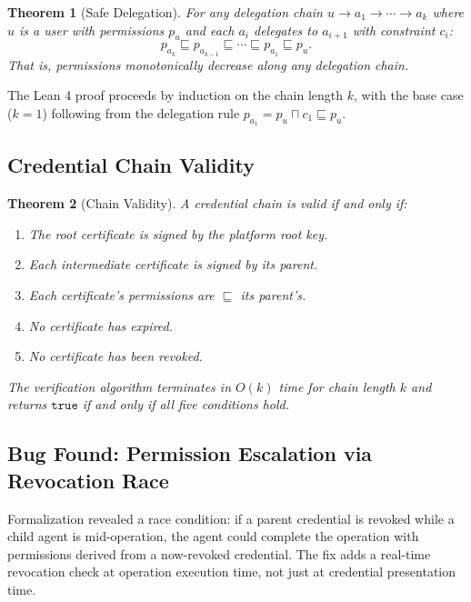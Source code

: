 \documentclass[11pt]{article}
\newtheorem{theorem}{Theorem}
\begin{document}
\begin{theorem}[Safe Delegation]
\label{thm:safe-delegation}
For any delegation chain $u \to a_1 \to \cdots \to a_k$ where $u$ is a user
with permissions $p_u$ and each $a_i$ delegates to $a_{i+1}$ with constraint
$c_i$:
\begin{equation}
p_{a_k} \sqsubseteq p_{a_{k-1}} \sqsubseteq \cdots \sqsubseteq p_{a_1}
\sqsubseteq p_u.
\end{equation}
That is, permissions monotonically decrease along any delegation chain.
\end{theorem}

The Lean 4 proof proceeds by induction on the chain length $k$, with the base
case ($k=1$) following from the delegation rule $p_{a_1} = p_u \sqcap c_1
\sqsubseteq p_u$.

\subsection{Credential Chain Validity}

\begin{theorem}[Chain Validity]
A credential chain is valid if and only if:
\begin{enumerate}[leftmargin=1.4em]
    \item The root certificate is signed by the platform root key.
    \item Each intermediate certificate is signed by its parent.
    \item Each certificate's permissions are $\sqsubseteq$ its parent's.
    \item No certificate has expired.
    \item No certificate has been revoked.
\end{enumerate}
The verification algorithm terminates in $O(k)$ time for chain length $k$ and
returns $\texttt{true}$ if and only if all five conditions hold.
\end{theorem}

\subsection{Bug Found: Permission Escalation via Revocation Race}

Formalization revealed a race condition: if a parent credential is revoked
while a child agent is mid-operation, the agent could complete the operation
with permissions derived from a now-revoked credential. The fix adds a
real-time revocation check at operation execution time, not just at credential
presentation time.
\end{document}
